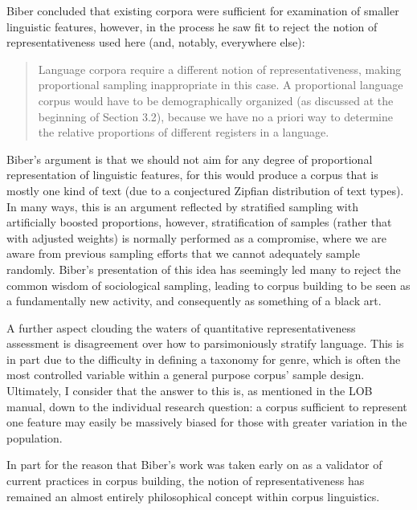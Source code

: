 
Biber concluded that existing corpora were sufficient for examination of smaller linguistic features, however, in the process he saw fit to reject the notion of representativeness used here (and, notably, everywhere else)\cite[p. 247]{biber1993representativeness}:

\begin{quote}
Language corpora require a different notion of representativeness, making proportional sampling inappropriate in this case. A proportional language corpus would have to be demographically organized (as discussed at the beginning of Section 3.2), because we have no a priori way to determine the relative proportions of different registers in a language.
\end{quote}

Biber's argument is that we should not aim for any degree of proportional representation of linguistic features, for this would produce a corpus that is mostly one kind of text (due to a conjectured Zipfian distribution of text types).  In many ways, this is an argument reflected by stratified sampling with artificially boosted proportions, however, stratification of samples (rather that with adjusted weights) is normally performed as a compromise, where we are aware from previous sampling efforts that we cannot adequately sample randomly.  Biber's presentation of this idea has seemingly led many to reject the common wisdom of sociological sampling, leading to corpus building to be seen as a fundamentally new activity, and consequently as something of a black art.


A further aspect clouding the waters of quantitative representativeness assessment is disagreement over how to parsimoniously stratify language.  This is in part due to the difficulty in defining a taxonomy for genre\cite{lee2001genres}, which is often the most controlled variable within a general purpose corpus' sample design.  Ultimately, I consider that the answer to this is, as mentioned in the LOB manual, down to the individual research question: a corpus sufficient to represent one feature may easily be massively biased for those with greater variation in the population.



In part for the reason that Biber's work was taken early on as a validator of current practices in corpus building, the notion of representativeness has remained an almost entirely philosophical concept within corpus linguistics.%


